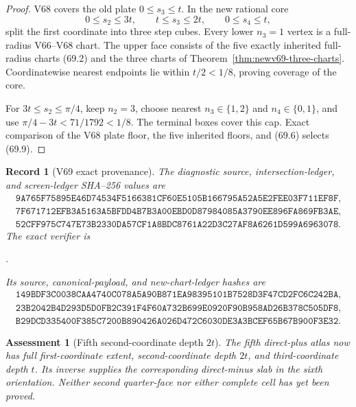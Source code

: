 \documentclass[11pt,oneside]{article}
\newtheorem{assessment}[theorem]{Assessment}
\newtheorem{record}[theorem]{Record}
\theoremstyle{definition}
\theoremstyle{remark}
\begin{document}
\begin{proof}
V68 covers the old plate \(0\le s_3\le t\).  In the new rational
core
\[
 0\le s_2\le3t,\qquad t\le s_3\le2t,\qquad
 0\le s_4\le t,                                       \tag{69.10}
\]
split the first coordinate into three step cubes.  Every lower
\(n_3=1\) vertex is a full-radius V66--V68 chart.  The upper face
consists of the five exactly inherited full-radius charts (69.2)
and the three charts of Theorem~\ref{thm:newv69-three-charts}.
Coordinatewise nearest endpoints lie within \(t/2<1/8\), proving
coverage of the core.

For \(3t\le s_2\le\pi/4\), keep \(n_2=3\), choose nearest
\(n_3\in\{1,2\}\) and \(n_4\in\{0,1\}\), and use
\(\pi/4-3t<71/1792<1/8\).  The terminal boxes cover this cap.
Exact comparison of the V68 plate floor, the five inherited floors,
and (69.6) selects (69.9).
\end{proof}

\begin{record}[V69 exact provenance]
\label{rec:newv69-provenance}
The diagnostic source, intersection-ledger, and screen-ledger
SHA--256 values are
\[
\begin{gathered}
\texttt{9A765F75895E46D74534F5166381CF60E5105B166795A52A5E2FEE03F711EF8F},\\
\texttt{7F671712EFB3A5163A5BFDD4B7B3A00EBD0D87984085A3790EE896FA869FB3AE},\\
\texttt{52CFF975C747E73B2330DA57CF1A8BDC8761A22D3C27AF8A6261D599A6963078}.
\end{gathered}                                        \tag{69.11}
\]
The exact verifier is
\begin{center}
\footnotesize
{}.
\end{center}
Its source, canonical-payload, and new-chart-ledger hashes are
\[
\begin{gathered}
\texttt{149BDF3C0038CAA4740C078A5A90B871EA98395101B7528D3F47CD2FC6C242BA},\\
\texttt{23B2042B4D293D5D0FB2C391F4F60A732B699E0920F90B958AD26B378C505DF8},\\
\texttt{B29DCD335400F385C7200B890426A026D472C6030DE3A3BCEF65B67B900F3E32}.
\end{gathered}                                        \tag{69.12}
\]
\end{record}

\begin{assessment}[Fifth second-coordinate depth \(2t\)]
\label{ass:newv69}
The fifth direct-plus atlas now has full first-coordinate extent,
second-coordinate depth \(2t\), and third-coordinate depth \(t\).
Its inverse supplies the corresponding direct-minus slab in the
sixth orientation.  Neither second quarter-face nor either complete
cell has yet been proved.
\end{assessment}
\end{document}
